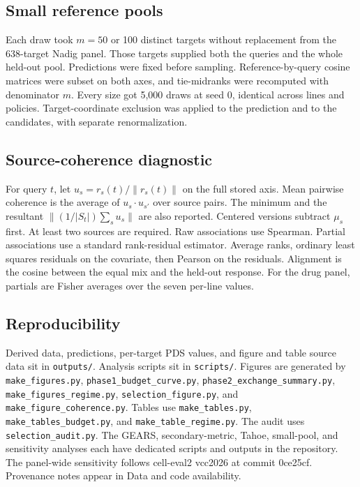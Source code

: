 \documentclass[12pt]{article}
\begin{document}
\subsection*{Small reference pools}

Each draw took $m = 50$ or 100 distinct targets without replacement from the 638-target Nadig panel. Those targets supplied both the queries and the whole held-out pool. Predictions were fixed before sampling. Reference-by-query cosine matrices were subset on both axes, and tie-midranks were recomputed with denominator $m$. Every size got 5,000 draws at seed 0, identical across lines and policies. Target-coordinate exclusion was applied to the prediction and to the candidates, with separate renormalization.

\subsection*{Source-coherence diagnostic}

For query $t$, let $u_s = r_s(t)/\lVert r_s(t) \rVert$ on the full stored axis. Mean pairwise coherence is the average of $u_s \cdot u_{s'}$ over source pairs. The minimum and the resultant $\lVert (1/|S_t|)\sum_s u_s \rVert$ are also reported. Centered versions subtract $\mu_s$ first. At least two sources are required. Raw associations use Spearman. Partial associations use a standard rank-residual estimator. Average ranks, ordinary least squares residuals on the covariate, then Pearson on the residuals. Alignment is the cosine between the equal mix and the held-out response. For the drug panel, partials are Fisher averages over the seven per-line values.

\subsection*{Reproducibility}

Derived data, predictions, per-target PDS values, and figure and table source data sit in \texttt{outputs/}. Analysis scripts sit in \texttt{scripts/}. Figures are generated by \texttt{make\_figures.py}, \texttt{phase1\_budget\_curve.py}, \texttt{phase2\_exchange\_summary.py}, \texttt{make\_figures\_regime.py}, \texttt{selection\_figure.py}, and \texttt{make\_figure\_coherence.py}. Tables use \texttt{make\_tables.py}, \texttt{make\_tables\_budget.py}, and \texttt{make\_table\_regime.py}. The audit uses \texttt{selection\_audit.py}. The GEARS, secondary-metric, Tahoe, small-pool, and sensitivity analyses each have dedicated scripts and outputs in the repository. The panel-wide sensitivity follows cell-eval2 vcc2026 at commit 0ce25cf. Provenance notes appear in Data and code availability.
\end{document}
